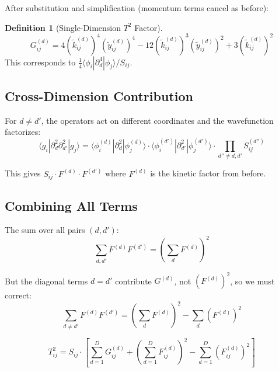 \documentclass[11pt,a4paper]{article}
\theoremstyle{definition}
\newtheorem{definition}{Definition}
\begin{document}
After substitution and simplification (momentum terms cancel as before):

\begin{definition}[Single-Dimension $T^2$ Factor]
\begin{equation}
G_{ij}^{(d)} = 4 (\tilde{k}_{ij}^{(d)})^4 (\tilde{y}_{ij}^{(d)})^4 - 12 (\tilde{k}_{ij}^{(d)})^3 (\tilde{y}_{ij}^{(d)})^2 + 3 (\tilde{k}_{ij}^{(d)})^2
\end{equation}
This corresponds to $\frac{1}{4}\langle \phi_i | \partial_d^4 | \phi_j \rangle / S_{ij}$.
\end{definition}

\subsection{Cross-Dimension Contribution}

For $d \neq d'$, the operators act on different coordinates and the wavefunction factorizes:
\begin{equation}
\langle g_i | \partial_d^2 \partial_{d'}^2 | g_j \rangle = \langle \phi_i^{(d)} | \partial_d^2 | \phi_j^{(d)} \rangle \cdot \langle \phi_i^{(d')} | \partial_{d'}^2 | \phi_j^{(d')} \rangle \cdot \prod_{d'' \neq d, d'} S^{(d'')}_{ij}
\end{equation}

This gives $S_{ij} \cdot F^{(d)} \cdot F^{(d')}$ where $F^{(d)}$ is the kinetic factor from before.

\subsection{Combining All Terms}

The sum over all pairs $(d, d')$:
\begin{equation}
\sum_{d,d'} F^{(d)} F^{(d')} = \left(\sum_d F^{(d)}\right)^2
\end{equation}

But the diagonal terms $d = d'$ contribute $G^{(d)}$, not $(F^{(d)})^2$, so we must correct:
\begin{equation}
\sum_{d \neq d'} F^{(d)} F^{(d')} = \left(\sum_d F^{(d)}\right)^2 - \sum_d (F^{(d)})^2
\end{equation}

\begin{tcolorbox}[colback=green!5,colframe=green!50!black,title=Kinetic Squared Matrix $T^2$]
\begin{equation}
T^2_{ij} = S_{ij} \cdot \left[ \sum_{d=1}^{D} G_{ij}^{(d)} + \left(\sum_{d=1}^{D} F_{ij}^{(d)}\right)^2 - \sum_{d=1}^{D} (F_{ij}^{(d)})^2 \right]
\end{equation}
\end{tcolorbox}
\end{document}
